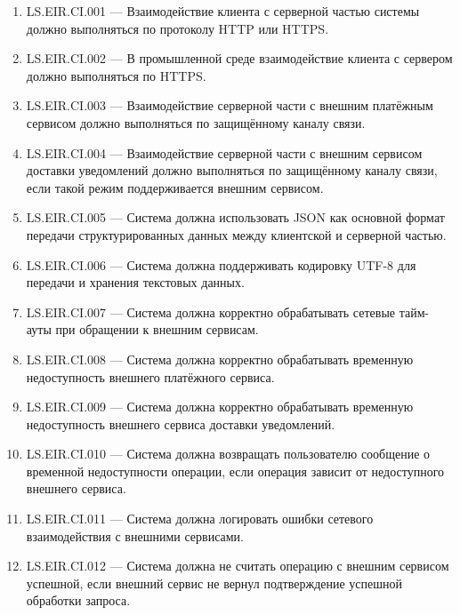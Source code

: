 \documentclass[12pt,a4paper]{article}
\begin{document}
	\begin{enumerate}
		\item LS.EIR.CI.001 --- Взаимодействие клиента с серверной частью системы должно
		выполняться по протоколу HTTP или HTTPS.
		
		\item LS.EIR.CI.002 --- В промышленной среде взаимодействие клиента с сервером
		должно выполняться по HTTPS.
		
		\item LS.EIR.CI.003 --- Взаимодействие серверной части с внешним платёжным сервисом
		должно выполняться по защищённому каналу связи.
		
		\item LS.EIR.CI.004 --- Взаимодействие серверной части с внешним сервисом доставки
		уведомлений должно выполняться по защищённому каналу связи, если такой режим
		поддерживается внешним сервисом.
		
		\item LS.EIR.CI.005 --- Система должна использовать JSON как основной формат
		передачи структурированных данных между клиентской и серверной частью.
		
		\item LS.EIR.CI.006 --- Система должна поддерживать кодировку UTF-8 для передачи
		и хранения текстовых данных.
		
		\item LS.EIR.CI.007 --- Система должна корректно обрабатывать сетевые тайм-ауты
		при обращении к внешним сервисам.
		
		\item LS.EIR.CI.008 --- Система должна корректно обрабатывать временную
		недоступность внешнего платёжного сервиса.
		
		\item LS.EIR.CI.009 --- Система должна корректно обрабатывать временную
		недоступность внешнего сервиса доставки уведомлений.
		
		\item LS.EIR.CI.010 --- Система должна возвращать пользователю сообщение
		о временной недоступности операции, если операция зависит от недоступного
		внешнего сервиса.
		
		\item LS.EIR.CI.011 --- Система должна логировать ошибки сетевого взаимодействия
		с внешними сервисами.
		
		\item LS.EIR.CI.012 --- Система должна не считать операцию с внешним сервисом
		успешной, если внешний сервис не вернул подтверждение успешной обработки
		запроса.
	\end{enumerate}
	
\end{document}
